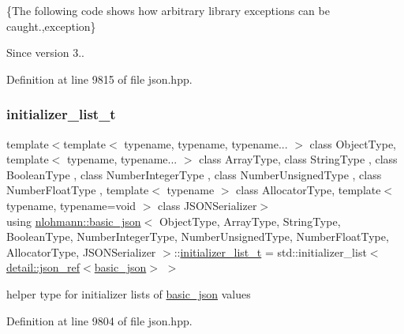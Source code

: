 \{The following code shows how arbitrary library exceptions can be caught.,exception\}

\begin{DoxySince}{Since}
version 3.. 
\end{DoxySince}


Definition at line 9815 of file json.\+hpp.

\mbox{\label{classnlohmann_1_1basic__json_ad70a098fbc01c53497db29d3b5b656a9}} 
\subsubsection{\texorpdfstring{initializer\+\_\+list\+\_\+t}{initializer\_list\_t}}
{\footnotesize\ttfamily template$<$template$<$ typename, typename, typename... $>$ class Object\+Type, template$<$ typename, typename... $>$ class Array\+Type, class String\+Type , class Boolean\+Type , class Number\+Integer\+Type , class Number\+Unsigned\+Type , class Number\+Float\+Type , template$<$ typename $>$ class Allocator\+Type, template$<$ typename, typename=void $>$ class J\+S\+O\+N\+Serializer$>$ \\
using \hyperlink{classnlohmann_1_1basic__json}{nlohmann\+::basic\+\_\+json}$<$ Object\+Type, Array\+Type, String\+Type, Boolean\+Type, Number\+Integer\+Type, Number\+Unsigned\+Type, Number\+Float\+Type, Allocator\+Type, J\+S\+O\+N\+Serializer $>$\+::\hyperlink{classnlohmann_1_1basic__json_ad70a098fbc01c53497db29d3b5b656a9}{initializer\+\_\+list\+\_\+t} =  std\+::initializer\+\_\+list$<$\hyperlink{classnlohmann_1_1detail_1_1json__ref}{detail\+::json\+\_\+ref}$<$\hyperlink{classnlohmann_1_1basic__json}{basic\+\_\+json}$>$ $>$}



helper type for initializer lists of \hyperlink{classnlohmann_1_1basic__json}{basic\+\_\+json} values 



Definition at line 9804 of file json.\+hpp.

\mbox{\label{classnlohmann_1_1basic__json_a3ce72c6254981a9d378ece3c9b15e96b}} 
